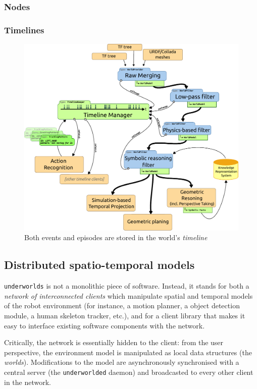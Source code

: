 \documentclass[letterpaper, 10 pt, conference]{ieeeconf}  %
\newcommand{\uwds}{{\tt underworlds}\xspace}
\begin{document}
\subsubsection{Nodes}

\subsubsection{Timelines}

\begin{figure}
    \centering
    \includegraphics[width=0.9\linewidth]{timeline}
    \caption{Both events and episodes are stored in the world's \emph{timeline}}

    \label{fig|timeline}
\end{figure}


\subsection{Distributed spatio-temporal models}
\label{arch}

\uwds is not a monolithic piece of software. Instead, it stands for both a
\emph{network of interconnected clients} which manipulate spatial and temporal
models of the robot environment (for instance, a motion planner, a object
detection module, a human skeleton tracker, etc.), and for a {client library}
that makes it easy to interface existing software components with the network.

Critically, the network is essentially hidden to the client: from the user
perspective, the environment model is manipulated as local data structures (the
\emph{worlds}). Modifications to the model are asynchronously synchronised with
a central server (the {\tt underworlded} daemon) and broadcasted to every other
client in the network.
\end{document}
